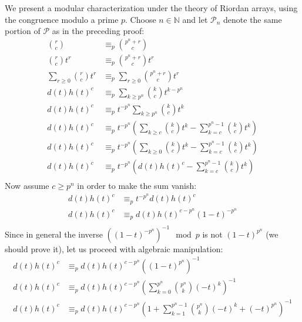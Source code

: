 \documentclass[11pt,a4paper]{article} %
\begin{document}
    We present a modular characterization under the theory of Riordan arrays, using the
    congruence modulo a prime $p$. Choose $n\in\mathbb{N}$ and let $\mathcal{P}_n$ denote the
    same portion of $\mathcal{P}$ as in the preceding proof:
      \begin{displaymath}
          \begin{split}
                {{r} \choose {c}} &\equiv_p {{p^n+r} \choose {c}} \\
                {{r} \choose {c}}t^r &\equiv_p {{p^n+r} \choose {c}}t^r \\
                \sum_{r\geq 0}{{{r} \choose {c}}t^r} &\equiv_p \sum_{r\geq 0}{{{p^n+r} \choose {c}}t^r} \\
                d(t)h(t)^{c} &\equiv_p \sum_{k\geq p^n}{{{k} \choose {c}}t^{k-p^n}} \\
                d(t)h(t)^{c} &\equiv_p t^{-p^n}\sum_{k\geq p^n}{{{k} \choose {c}}t^{k}} \\
                d(t)h(t)^{c} &\equiv_p t^{-p^n}\left(
                    \sum_{k\geq c}{{{k} \choose {c}}t^{k}}-\sum_{k=c}^{p^n -1}{{{k} \choose {c}}t^{k}}\right) \\
                d(t)h(t)^{c} &\equiv_p t^{-p^n}\left(
                    \sum_{k\geq 0}{{{k} \choose {c}}t^{k}}-\sum_{k=c}^{p^n -1}{{{k} \choose {c}}t^{k}}\right) \\
                d(t)h(t)^{c} &\equiv_p t^{-p^n}\left(d(t)h(t)^{c} -\sum_{k=c}^{p^n -1}{{{k} \choose {c}}t^{k}}\right) \\
          \end{split}
      \end{displaymath}
    Now assume $c \geq p^n$ in order to make the sum vanish:
      \begin{displaymath}
          \begin{split}
                d(t)h(t)^{c} &\equiv_p t^{-p^n} d(t)h(t)^{c} \\
                d(t)h(t)^{c} &\equiv_p d(t)h(t)^{c-p^n} (1-t)^{-p^n} \\
          \end{split}
      \end{displaymath}
    Since in general the inverse $\left((1-t)^{-p^n}\right)^{-1}\mod p$ is not $(1-t)^{p^n}$
    (we should prove it), let us proceed with algebraic manipulation:
      \begin{displaymath}
          \begin{split}
                d(t)h(t)^{c} &\equiv_p d(t)h(t)^{c-p^n}\left( (1-t)^{p^n}\right)^{-1} \\
                d(t)h(t)^{c} &\equiv_p d(t)h(t)^{c-p^n}\left(\sum_{k=0}^{p^n}{{{p^n} \choose {k}}(-t)^k } \right)^{-1}\\
                d(t)h(t)^{c} &\equiv_p d(t)h(t)^{c-p^n}\left(
                    1 + \sum_{k=1}^{p^n -1}{{{p^n} \choose {k}}(-t)^k +(-t)^{p^n} }\right)^{-1} \\
          \end{split}
      \end{displaymath}
\end{document}
